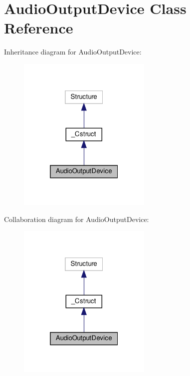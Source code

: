 \hypertarget{classvlc_1_1_audio_output_device}{}\section{Audio\+Output\+Device Class Reference}
\label{classvlc_1_1_audio_output_device}


Inheritance diagram for Audio\+Output\+Device\+:
\nopagebreak
\begin{figure}[H]
\begin{center}
\leavevmode
\includegraphics[width=181pt]{classvlc_1_1_audio_output_device__inherit__graph}
\end{center}
\end{figure}


Collaboration diagram for Audio\+Output\+Device\+:
\nopagebreak
\begin{figure}[H]
\begin{center}
\leavevmode
\includegraphics[width=181pt]{classvlc_1_1_audio_output_device__coll__graph}
\end{center}
\end{figure}
